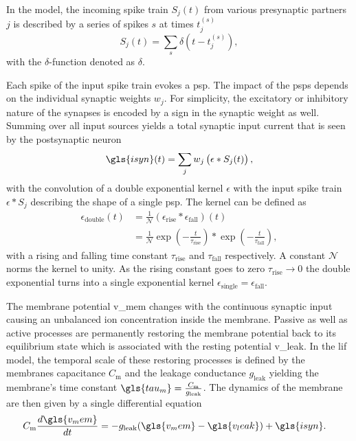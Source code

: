In the model, the incoming spike train $S_j(t)$ from various presynaptic partners $j$ is described by a series of spikes $s$ at times $t_j^{(s)}$
\begin{equation*}
S_j(t) = \sum_s \delta(t - t_j^{(s)}),
\end{equation*}
with the $\delta$-function denoted as $\delta$. 

Each spike of the input spike train evokes a \gls{psp}. The impact of the \glspl{psp} depends on the individual synaptic weights $w_j$. For simplicity, the excitatory or inhibitory nature of the synapses is encoded by a sign in the synaptic weight as well. Summing over all input sources yields a total synaptic input current that is seen by the postsynaptic neuron
\begin{equation}
\gls{isyn}(t) = \sum_j w_j \left(\epsilon \ast S_j(t)\right),
\label{synaptic_input}
\end{equation}
with the convolution of a double exponential kernel $\epsilon$ with the input spike train $\epsilon \ast S_j$ describing the shape of a single \gls{psp}. The kernel can be defined as
\begin{align*}
\epsilon_\text{double}(t) 	&=\frac{1}{\mathcal{N}} \left(\epsilon_\text{rise} \ast \epsilon_\text{fall}\right)(t) \\
&=\frac{1}{\mathcal{N}}\exp \left(-\frac{t}{\tau_\text{rise}} \right)  \ast \exp \left(-\frac{t}{\tau_\text{fall}} \right), 
\end{align*}
with a rising and falling time constant $\tau_\text{rise}$ and $\tau_\text{fall}$ respectively. A constant $\mathcal{N}$ norms the kernel to unity. As the rising constant goes to zero $\tau_\text{rise} \rightarrow 0$ the double exponential turns into a single exponential kernel $\epsilon_\text{single} = \epsilon_\text{fall}$.

The membrane potential \gls{v_mem} changes with the continuous synaptic input causing an unbalanced ion concentration inside the membrane. Passive as well as active processes are permanently restoring the membrane potential back to its equilibrium state which is associated with the resting potential \gls{v_leak}. In the \gls{lif} model, the temporal scale of these restoring processes is defined by the membranes capacitance $C_\text{m}$ and the leakage conductance $g_\text{leak}$ yielding the membrane's time constant $\gls{tau_m} = \frac{C_\text{m}}{g_\text{leak}}$. The dynamics of the membrane are then given by a single differential equation
\begin{align}
\label{lifeq}
C_{\text{m}} \frac{d\gls{v_mem}}{dt} &= -g_{\text{leak}} (\gls{v_mem} - \gls{v_leak}) + \gls{isyn}.
\end{align}

